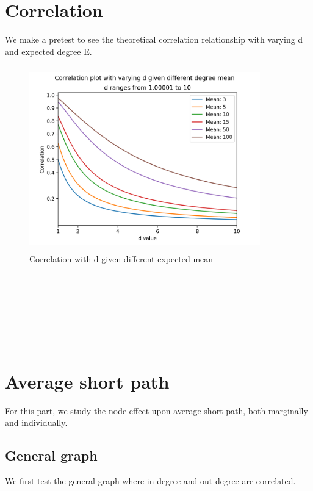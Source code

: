 \documentclass[10pt,english]{article}\usepackage{graphicx, color}
\numberwithin{equation}{section}
\numberwithin{figure}{section}
\begin{document}
\section{Correlation}
We make a pretest to see the theoretical correlation relationship with varying d and expected degree E.\\
\begin{figure}[htbp]
\centering\includegraphics[width=10cm, height=8cm]{correlation}
\caption{Correlation with d given different expected mean}
\end{figure}
\quad\\


\quad\\
\quad\\
\quad\\
\quad\\
\quad\\
\section{Average short path}
For this part, we study the node effect upon average short path, both marginally and individually.\\
\subsection{General graph}
We first test the general graph where in-degree and out-degree are correlated. \\
\quad\\
\end{document}
